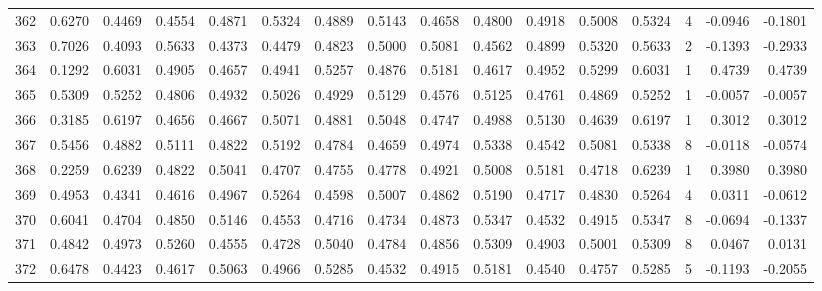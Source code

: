 \begin{tabular}{lrrrrrrrrrrrrrrr}
362 &      0.6270 &  0.4469 &  0.4554 &  0.4871 &  0.5324 &  0.4889 &  0.5143 &  0.4658 &  0.4800 &  0.4918 &   0.5008 &     0.5324 &      4 &                   -0.0946 &                    -0.1801 \\
363 &      0.7026 &  0.4093 &  0.5633 &  0.4373 &  0.4479 &  0.4823 &  0.5000 &  0.5081 &  0.4562 &  0.4899 &   0.5320 &     0.5633 &      2 &                   -0.1393 &                    -0.2933 \\
364 &      0.1292 &  0.6031 &  0.4905 &  0.4657 &  0.4941 &  0.5257 &  0.4876 &  0.5181 &  0.4617 &  0.4952 &   0.5299 &     0.6031 &      1 &                    0.4739 &                     0.4739 \\
365 &      0.5309 &  0.5252 &  0.4806 &  0.4932 &  0.5026 &  0.4929 &  0.5129 &  0.4576 &  0.5125 &  0.4761 &   0.4869 &     0.5252 &      1 &                   -0.0057 &                    -0.0057 \\
366 &      0.3185 &  0.6197 &  0.4656 &  0.4667 &  0.5071 &  0.4881 &  0.5048 &  0.4747 &  0.4988 &  0.5130 &   0.4639 &     0.6197 &      1 &                    0.3012 &                     0.3012 \\
367 &      0.5456 &  0.4882 &  0.5111 &  0.4822 &  0.5192 &  0.4784 &  0.4659 &  0.4974 &  0.5338 &  0.4542 &   0.5081 &     0.5338 &      8 &                   -0.0118 &                    -0.0574 \\
368 &      0.2259 &  0.6239 &  0.4822 &  0.5041 &  0.4707 &  0.4755 &  0.4778 &  0.4921 &  0.5008 &  0.5181 &   0.4718 &     0.6239 &      1 &                    0.3980 &                     0.3980 \\
369 &      0.4953 &  0.4341 &  0.4616 &  0.4967 &  0.5264 &  0.4598 &  0.5007 &  0.4862 &  0.5190 &  0.4717 &   0.4830 &     0.5264 &      4 &                    0.0311 &                    -0.0612 \\
370 &      0.6041 &  0.4704 &  0.4850 &  0.5146 &  0.4553 &  0.4716 &  0.4734 &  0.4873 &  0.5347 &  0.4532 &   0.4915 &     0.5347 &      8 &                   -0.0694 &                    -0.1337 \\
371 &      0.4842 &  0.4973 &  0.5260 &  0.4555 &  0.4728 &  0.5040 &  0.4784 &  0.4856 &  0.5309 &  0.4903 &   0.5001 &     0.5309 &      8 &                    0.0467 &                     0.0131 \\
372 &      0.6478 &  0.4423 &  0.4617 &  0.5063 &  0.4966 &  0.5285 &  0.4532 &  0.4915 &  0.5181 &  0.4540 &   0.4757 &     0.5285 &      5 &                   -0.1193 &                    -0.2055 \\

\end{tabular}

